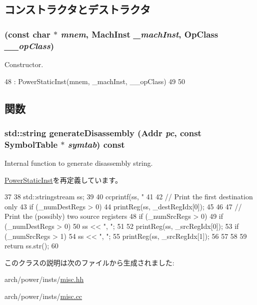 \subsection{コンストラクタとデストラクタ}
\hypertarget{classPowerISA_1_1MiscOp_a526e96598b64c32357da0b7fd18e9d23}{
\subsubsection[{MiscOp}]{ (const char $\ast$ {\em mnem}, \/  {\bf MachInst} {\em \_\-machInst}, \/  OpClass {\em \_\-\_\-opClass})}}
\label{classPowerISA_1_1MiscOp_a526e96598b64c32357da0b7fd18e9d23}


Constructor. 


\begin{DoxyCode}
48       : PowerStaticInst(mnem, _machInst, __opClass)
49     {
50     }
\end{DoxyCode}


\subsection{関数}
\hypertarget{classPowerISA_1_1MiscOp_a95d323a22a5f07e14d6b4c9385a91896}{
\subsubsection[{generateDisassembly}]{\setlength{\rightskip}{0pt plus 5cm}std::string generateDisassembly ({\bf Addr} {\em pc}, \/  const SymbolTable $\ast$ {\em symtab}) const}}
\label{classPowerISA_1_1MiscOp_a95d323a22a5f07e14d6b4c9385a91896}
Internal function to generate disassembly string. 

\hyperlink{classPowerISA_1_1PowerStaticInst_a95d323a22a5f07e14d6b4c9385a91896}{PowerStaticInst}を再定義しています。


\begin{DoxyCode}
37 {
38     std::stringstream ss;
39 
40     ccprintf(ss, "%
41 
42     // Print the first destination only
43     if (_numDestRegs > 0) {
44         printReg(ss, _destRegIdx[0]);
45     }
46 
47     // Print the (possibly) two source registers
48     if (_numSrcRegs > 0) {
49         if (_numDestRegs > 0) {
50             ss << ", ";
51         }
52         printReg(ss, _srcRegIdx[0]);
53         if (_numSrcRegs > 1) {
54           ss << ", ";
55           printReg(ss, _srcRegIdx[1]);
56         }
57     }
58 
59     return ss.str();
60 }
\end{DoxyCode}


このクラスの説明は次のファイルから生成されました:\begin{DoxyCompactItemize}
\item 
arch/power/insts/\hyperlink{arch_2power_2insts_2misc_8hh}{misc.hh}\item 
arch/power/insts/\hyperlink{arch_2power_2insts_2misc_8cc}{misc.cc}\end{DoxyCompactItemize}
